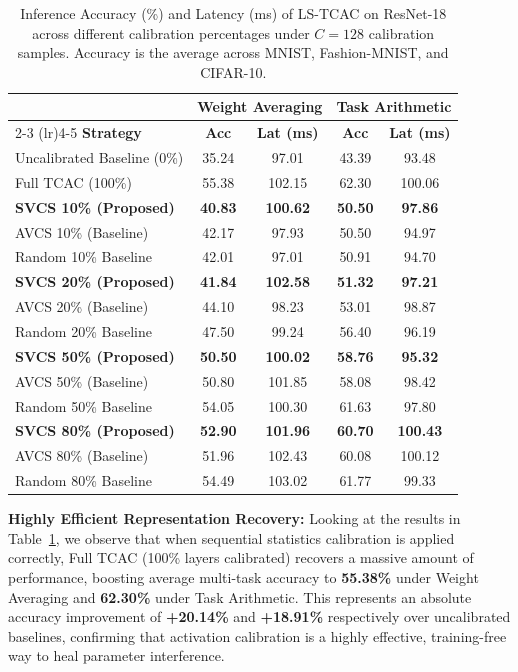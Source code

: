 \documentclass{article}
\theoremstyle{plain}
\theoremstyle{definition}
\theoremstyle{remark}
\begin{document}
\begin{table}[t]
\centering
\caption{Inference Accuracy (\%) and Latency (ms) of LS-TCAC on ResNet-18 across different calibration percentages under $C=128$ calibration samples. Accuracy is the average across MNIST, Fashion-MNIST, and CIFAR-10.}
\label{tab:main_results}
\begin{small}
\begin{tabular}{lcccc}
\toprule
& \multicolumn{2}{c}{\textbf{Weight Averaging}} & \multicolumn{2}{c}{\textbf{Task Arithmetic}} \\
\cmidrule(lr){2-3} \cmidrule(lr){4-5}
\textbf{Strategy} & \textbf{Acc} & \textbf{Lat (ms)} & \textbf{Acc} & \textbf{Lat (ms)} \\
\midrule
Uncalibrated Baseline (0\%) & 35.24 & 97.01 & 43.39 & 93.48 \\
Full TCAC (100\%) & 55.38 & 102.15 & 62.30 & 100.06 \\
\midrule
\textbf{SVCS 10\% (Proposed)} & \textbf{40.83} & \textbf{100.62} & \textbf{50.50} & \textbf{97.86} \\
AVCS 10\% (Baseline) & 42.17 & 97.93 & 50.50 & 94.97 \\
Random 10\% Baseline & 42.01 & 97.01 & 50.91 & 94.70 \\
\midrule
\textbf{SVCS 20\% (Proposed)} & \textbf{41.84} & \textbf{102.58} & \textbf{51.32} & \textbf{97.21} \\
AVCS 20\% (Baseline) & 44.10 & 98.23 & 53.01 & 98.87 \\
Random 20\% Baseline & 47.50 & 99.24 & 56.40 & 96.19 \\
\midrule
\textbf{SVCS 50\% (Proposed)} & \textbf{50.50} & \textbf{100.02} & \textbf{58.76} & \textbf{95.32} \\
AVCS 50\% (Baseline) & 50.80 & 101.85 & 58.08 & 98.42 \\
Random 50\% Baseline & 54.05 & 100.30 & 61.63 & 97.80 \\
\midrule
\textbf{SVCS 80\% (Proposed)} & \textbf{52.90} & \textbf{101.96} & \textbf{60.70} & \textbf{100.43} \\
AVCS 80\% (Baseline) & 51.96 & 102.43 & 60.08 & 100.12 \\
Random 80\% Baseline & 54.49 & 103.02 & 61.77 & 99.33 \\
\bottomrule
\end{tabular}
\end{small}
\end{table}

\textbf{Highly Efficient Representation Recovery:} Looking at the results in Table~\ref{tab:main_results}, we observe that when sequential statistics calibration is applied correctly, Full TCAC (100\% layers calibrated) recovers a massive amount of performance, boosting average multi-task accuracy to \textbf{55.38\%} under Weight Averaging and \textbf{62.30\%} under Task Arithmetic. This represents an absolute accuracy improvement of \textbf{+20.14\%} and \textbf{+18.91\%} respectively over uncalibrated baselines, confirming that activation calibration is a highly effective, training-free way to heal parameter interference.
\end{document}
